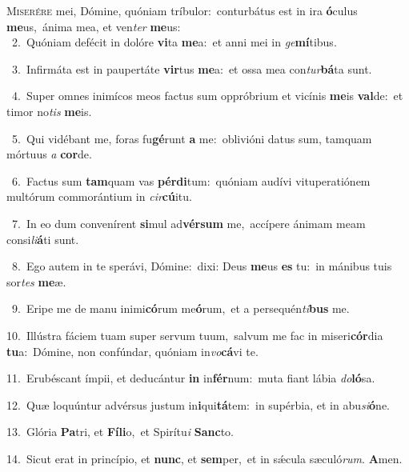 \lettrine{\initial\textcolor{\initialcolor}{M}}{iserére} mei, Dómine, quóniam tríbulor:~\dagger conturbátus est in ira \textbf{ó}\-culus \textbf{me}\-us,~\star ánima mea, et ven\textit{ter} \textbf{me}\-us:\\
{\numbfont\textcolor{\numbcolor}{~2.}}~Quóniam defécit in dolóre \textbf{vi}\-ta \textbf{me}\-a:~\star et anni mei in \textit{ge}\-\textbf{mí}tibus.\par
{\numbfont\textcolor{\numbcolor}{~3.}}~Infirmáta est in paupertáte \textbf{vir}\-tus \textbf{me}\-a:~\star et ossa mea con\-\textit{tur}\-\textbf{bá}ta sunt.\par
{\numbfont\textcolor{\numbcolor}{~4.}}~Super omnes inimícos meos factus sum oppróbrium et vicínis \textbf{me}\-is \textbf{val}\-de:~\star et timor no\textit{tis} \textbf{me}\-is.\par
{\numbfont\textcolor{\numbcolor}{~5.}}~Qui vidébant me, foras fu\-\textbf{gé}\-runt \textbf{a} me:~\star oblivióni datus sum, tamquam mórtuus \textit{a} \textbf{cor}\-de.\par
{\numbfont\textcolor{\numbcolor}{~6.}}~Factus sum \textbf{tam}\-quam vas \textbf{pér}\-\textbf{di}tum:~\star quóniam audívi vituperatiónem multórum commorántium in \textit{cir}\-\textbf{cú}itu.\par
{\numbfont\textcolor{\numbcolor}{~7.}}~In eo dum convenírent \textbf{si}\-mul ad\-\textbf{vér}\-\textbf{sum} me,~\star accípere ánimam meam consi\-\textit{li}\-\textbf{á}ti sunt.\par
{\numbfont\textcolor{\numbcolor}{~8.}}~Ego autem in te sperávi, Dómine:~\dagger dixi: Deus \textbf{me}\-us \textbf{es} tu:~\star in mánibus tuis sor\textit{tes} \textbf{me}\-æ.\par
{\numbfont\textcolor{\numbcolor}{~9.}}~Eripe me de manu inimi\-\textbf{có}\-rum me\-\textbf{ó}\-rum,~\star et a persequén\-\textit{ti}\-\textbf{bus} me.\par
{\numbfont\textcolor{\numbcolor}{10.}}~Illústra fáciem tuam super servum tuum,~\dagger salvum me fac in miseri\-\textbf{cór}\-dia \textbf{tu}\-a:~\star Dómine, non confúndar, quóniam in\-\textit{vo}\-\textbf{cá}vi te.\par
{\numbfont\textcolor{\numbcolor}{11.}}~Erubéscant ímpii, et deducántur \textbf{in} in\-\textbf{fér}\-num:~\star muta fiant lábia \textit{do}\-\textbf{ló}sa.\par
{\numbfont\textcolor{\numbcolor}{12.}}~Quæ loquúntur advérsus justum in\-\textbf{i}\-qui\-\textbf{tá}\-tem:~\star in supérbia, et in abu\-\textit{si}\-\textbf{ó}ne.\par
{\numbfont\textcolor{\numbcolor}{13.}}~Glória \textbf{Pa}\-tri, et \textbf{Fí}\-\textbf{li}o,~\star et Spirítu\textit{i} \textbf{Sanc}\-to.\par
{\numbfont\textcolor{\numbcolor}{14.}}~Sicut erat in princípio, et \textbf{nunc}\-, et \textbf{sem}\-per,~\star et in sǽcula sæculó\-\textit{rum}\-. \textbf{A}\-men.\par
